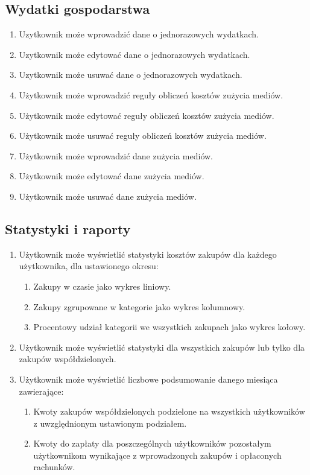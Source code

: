 \subsection{Wydatki gospodarstwa}

\begin{enumerate}
    \item Uzytkownik może wprowadzić dane o jednorazowych wydatkach.
    \item Uzytkownik może edytować dane o jednorazowych wydatkach.
    \item Uzytkownik może usuwać dane o jednorazowych wydatkach.
    \item Użytkownik może wprowadzić reguły obliczeń kosztów zużycia mediów.    
    \item Użytkownik może edytować reguły obliczeń kosztów zużycia mediów.    
    \item Użytkownik może usuwać reguły obliczeń kosztów zużycia mediów.    
    \item Użytkownik może wprowadzić dane zużycia mediów.
    \item Użytkownik może edytować dane zużycia mediów.
    \item Użytkownik może usuwać dane zużycia mediów.
\end{enumerate}

\newpage

\subsection{Statystyki i raporty}

\begin{enumerate}
    \item Użytkownik może wyświetlić statystyki kosztów zakupów dla każdego użytkownika, dla ustawionego okresu:
    \begin{enumerate}
        \item Zakupy w czasie jako wykres liniowy.
        \item Zakupy zgrupowane w kategorie jako wykres kolumnowy.
        \item Procentowy udział kategorii we wszystkich zakupach jako wykres kołowy.
    \end{enumerate}
    \item Użytkownik może wyświetlić statystyki dla wszystkich zakupów lub tylko dla zakupów współdzielonych.
    \item Użytkownik może wyświetlić liczbowe podsumowanie danego miesiąca zawierające:
    \begin{enumerate}
        \item Kwoty zakupów współdzielonych podzielone na wszystkich użytkowników z uwzględnionym ustawionym podziałem.
        \item Kwoty do zapłaty dla poszczególnych użytkowników pozostałym użytkownikom wynikające z wprowadzonych zakupów i opłaconych rachunków.
    \end{enumerate}
\end{enumerate}

